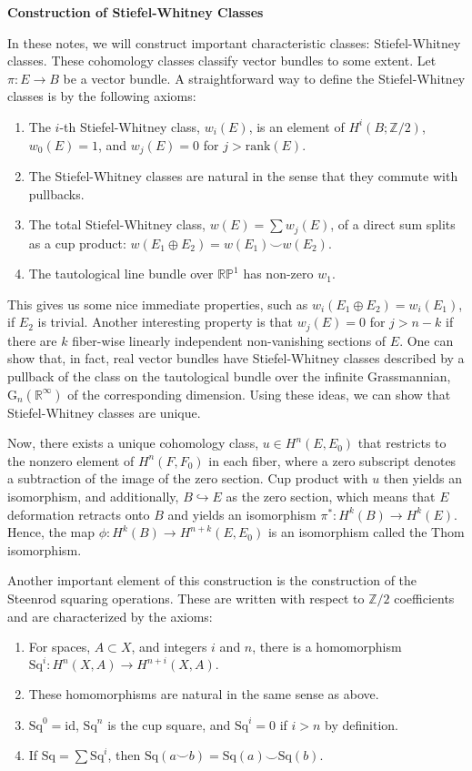 \documentclass[12pt]{book}
\theoremstyle{definition}
\theoremstyle{remark}
\newcommand{\BR}{\mathbb R}
\newcommand{\BZ}{\mathbb Z}
\newcommand{\Sq}{\mathrm{Sq}}
\newcommand{\rank}{\mathrm{rank}}
\newcommand{\id}{\mathrm{id}}
\newcommand{\s}{\subset}
\begin{document}
\begin{center}
\textbf{\Large Construction of Stiefel-Whitney Classes}
\end{center}

In these notes, we will construct important characteristic classes: Stiefel-Whitney classes. These cohomology classes classify vector bundles to some extent. Let $\pi : E \to B$ be a vector bundle. A straightforward way to define the Stiefel-Whitney classes is by the following axioms:
\begin{enumerate}
\item The $i$-th Stiefel-Whitney class, $w_{i}(E)$, is an element of $H^{i}(B;\BZ/2)$, $w_{0}(E) = 1$, and $w_{j}(E) = 0$ for $j > \rank(E).$
\item The Stiefel-Whitney classes are natural in the sense that they commute with pullbacks.
\item The total Stiefel-Whitney class, $w(E) = \sum w_{j}(E)$, of a direct sum splits as a cup product: $w(E_{1} \oplus E_{2}) = w(E_{1}) \smile w(E_{2}).$
\item The tautological line bundle over $\mathbb{RP}^{1}$ has non-zero $w_{1}.$
\end{enumerate}

This gives us some nice immediate properties, such as $w_{i}(E_{1} \oplus E_{2}) = w_{i}(E_{1})$, if $E_{2}$ is trivial. Another interesting property is that $w_{j}(E) = 0$ for $j > n - k$ if there are $k$ fiber-wise linearly independent non-vanishing sections of $E.$ One can show that, in fact, real vector bundles have Stiefel-Whitney classes described by a pullback of the class on the tautological bundle over the infinite Grassmannian, $\mathrm{G}_{n}(\BR^{\infty})$ of the corresponding dimension. Using these ideas, we can show that Stiefel-Whitney classes are unique.

Now, there exists a unique cohomology class, $u \in H^{n}(E,E_{0})$ that restricts to the nonzero element of $H^{n}(F,F_{0})$ in each fiber, where a zero subscript denotes a subtraction of the image of the zero section. Cup product with $u$ then yields an isomorphism, and additionally, $B \hookrightarrow E$ as the zero section, which means that $E$ deformation retracts onto $B$ and yields an isomorphism $\pi^{*} : H^{k}(B) \to H^{k}(E).$ Hence, the map $\phi : H^{k}(B) \to H^{n + k}(E,E_{0})$ is an isomorphism called the Thom isomorphism.

Another important element of this construction is the construction of the Steenrod squaring operations. These are written with respect to $\BZ/2$ coefficients and are characterized by the axioms:
\begin{enumerate}
\item For spaces, $A \s X$, and integers $i$ and $n$, there is a homomorphism $\Sq^{i} : H^{n}(X,A) \to H^{n + i}(X,A).$
\item These homomorphisms are natural in the same sense as above.
\item $\Sq^{0} = \id$, $\Sq^{n}$ is the cup square, and $\Sq^{i} = 0$ if $i > n$ by definition.
\item If $\Sq = \sum \Sq^{i}$, then $\Sq(a \smile b) = \Sq(a) \smile \Sq(b).$
\end{enumerate}
\end{document}
